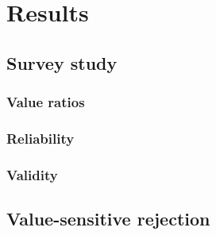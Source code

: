\chapter{Results}

\section{Survey study}

\subsection{Value ratios}

\subsection{Reliability}

\subsection{Validity}

\section{Value-sensitive rejection}
